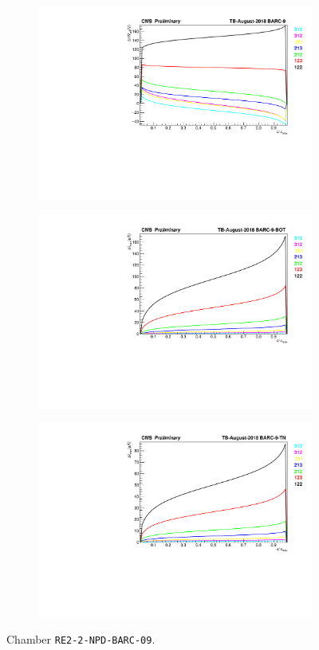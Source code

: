 	\begin{figure}[H]
    	\begin{subfigure}{\linewidth}
			\centering
    		\includegraphics[width = .5\linewidth]{fig/chapt5/Delta-HVeff-Graph-BARC-9.pdf}
        	\caption{\label{fig:august-delta:A}}
    	\end{subfigure}
    	\begin{subfigure}{0.5\linewidth}
			\centering
    		\includegraphics[width = \linewidth]{fig/chapt5/Delta-Imon-Graph-BARC-9-BOT.pdf}
        	\caption{\label{fig:august-delta:B}}
    	\end{subfigure}
    	\begin{subfigure}{0.5\linewidth}
			\centering
    		\includegraphics[width = \linewidth]{fig/chapt5/Delta-Imon-Graph-BARC-9-TN.pdf}
        	\caption{\label{fig:august-delta:C}}
    	\end{subfigure}
		\caption{\label{fig:august-delta} Chamber \texttt{RE2-2-NPD-BARC-09}.}
	\end{figure}
	
